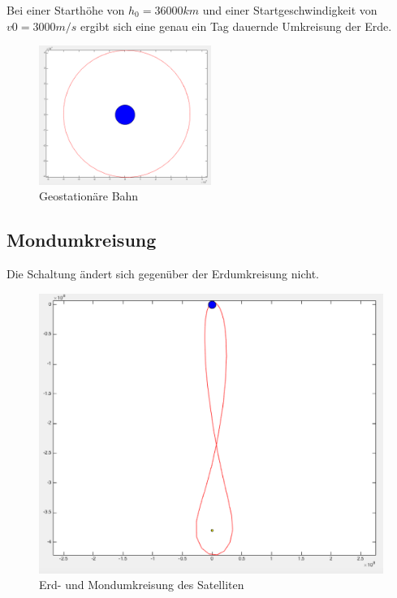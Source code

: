 \documentclass[10pt,a4paper]{article}
\begin{document}
Bei einer Starthöhe von $h_0 = 36000 km$ und einer Startgeschwindigkeit von $v0 = 3000 m/s$ ergibt sich eine genau ein Tag dauernde Umkreisung der Erde.
	
	\begin{figure}[H]
		\centering
		\includegraphics[width=0.5\textwidth]{../aufgabe1/screens/1c.png}
		\caption{Geostationäre Bahn}
	\end{figure}


\subsection{Mondumkreisung}

Die Schaltung ändert sich gegenüber der Erdumkreisung nicht.

	\begin{figure}[H]
		\centering
		\includegraphics[width=1\textwidth]{../aufgabe12/screens/2.png}
		\caption{Erd- und Mondumkreisung des Satelliten}
	\end{figure}
\end{document}
